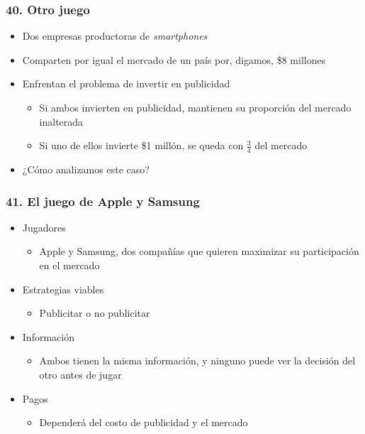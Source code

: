 \documentclass[14pt]{beamer}
\begin{document}
\begin{frame}
\frametitle{40. Otro juego}
\begin{itemize}
    \item Dos empresas productoras de \textit{smartphones}
    \item Comparten por igual el mercado de un país por, digamos, \$8 millones
    \item Enfrentan el problema de invertir en publicidad
        \begin{itemize}
        \item Si ambos invierten en publicidad, mantienen su proporción del mercado inalterada
        \item Si uno de ellos invierte  \$1 millón, se queda con $\frac{3}{4}$ del mercado
        \end{itemize}
    \item ¿Cómo analizamos este caso?    
\end{itemize}
\end{frame}

\begin{frame}
\frametitle{41. El juego de Apple y Samsung}
\begin{itemize}
    \item Jugadores
        \begin{itemize}
        \item Apple y Samsung, dos compañías que quieren maximizar su participación en el mercado
        \end{itemize}
    \item Estrategias viables
        \begin{itemize}
        \item Publicitar o no publicitar
        \end{itemize}
    \item Información
        \begin{itemize}
        \item Ambos tienen la misma información, y ninguno puede ver la decisión del otro antes de jugar
        \end{itemize}
    \item Pagos
        \begin{itemize}
        \item Dependerá del costo de publicidad y el mercado
        \end{itemize}
\end{itemize}
\end{frame}
\end{document}
